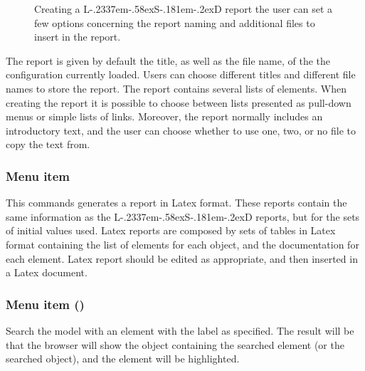 \documentclass [11pt,a4paper] {book}
\def\LsD{{L\kern-.2337em\lower-.58ex\hbox{S}\kern-.181em\lower-.2ex\hbox{D}}\xspace}
\begin{document}
\begin{figure}[ht]
  \centering
  \caption{Creating a \LsD report the user can set a few options concerning the report naming and additional files to insert in the report.}
  \label{fig:create_report}
\end{figure}

The report is given by default the title, as well as the file name, of the the configuration currently loaded. Users can choose different titles and different file names to store the report. The report contains several lists of elements. When creating the report it is possible to choose between lists presented as pull-down menus or simple lists of links. Moreover, the report normally includes an introductory text, and the user can choose whether to use one, two, or no file to copy the text from.



\subsubsection{Menu item  }

This commands generates a report in Latex format. These reports contain the same information as the \LsD reports, but for the sets of initial values used. Latex reports are composed by sets of tables in Latex format containing the list of elements for each object, and the documentation for each element. Latex report should be edited as appropriate, and then inserted in a Latex document.




\subsubsection{Menu item  ()}

Search the model with an element with the label as specified. The result will be that the browser will show the object containing the searched element (or the searched object), and the element will be highlighted.
\end{document}
